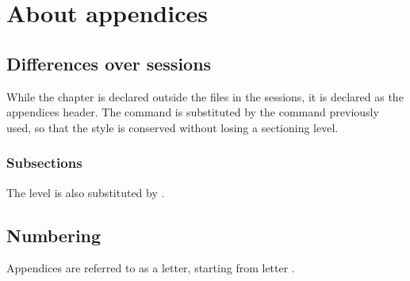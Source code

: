 \chapter{About appendices}

\section{Differences over sessions}

While the chapter is declared outside the  files in the sessions, it is declared as the appendices header.
The  command is substituted by the  command previously used, so that the style is conserved without losing a sectioning level.

\subsection{Subsections}

The  level is also substituted by .

\section{Numbering}

Appendices are referred to as a letter, starting from letter .


